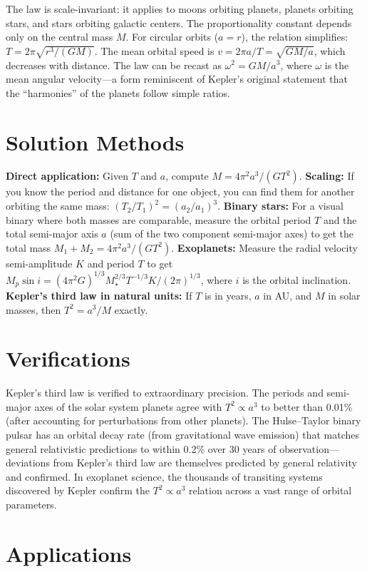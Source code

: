 \documentclass[11pt,openright]{book}
\begin{document}
The law is scale-invariant: it applies to moons orbiting planets, planets orbiting stars, and stars orbiting galactic centers. The proportionality constant depends only on the central mass $M$. For circular orbits ($a = r$), the relation simplifies: $T = 2\pi\sqrt{r^3/(GM)}$. The mean orbital speed is $v = 2\pi a/T = \sqrt{GM/a}$, which decreases with distance. The law can be recast as $\omega^2 = GM/a^3$, where $\omega$ is the mean angular velocity---a form reminiscent of Kepler's original statement that the ``harmonies'' of the planets follow simple ratios.
\section*{Solution Methods}

\textbf{Direct application:} Given $T$ and $a$, compute $M = 4\pi^2 a^3/(GT^2)$. \textbf{Scaling:} If you know the period and distance for one object, you can find them for another orbiting the same mass: $(T_2/T_1)^2 = (a_2/a_1)^3$. \textbf{Binary stars:} For a visual binary where both masses are comparable, measure the orbital period $T$ and the total semi-major axis $a$ (sum of the two component semi-major axes) to get the total mass $M_1 + M_2 = 4\pi^2 a^3/(GT^2)$. \textbf{Exoplanets:} Measure the radial velocity semi-amplitude $K$ and period $T$ to get $M_p\sin i = (4\pi^2 G)^{1/3} M_\star^{2/3} T^{-1/3} K / (2\pi)^{1/3}$, where $i$ is the orbital inclination. \textbf{Kepler's third law in natural units:} If $T$ is in years, $a$ in AU, and $M$ in solar masses, then $T^2 = a^3/M$ exactly.
\section*{Verifications}

Kepler's third law is verified to extraordinary precision. The periods and semi-major axes of the solar system planets agree with $T^2 \propto a^3$ to better than 0.01\% (after accounting for perturbations from other planets). The Hulse--Taylor binary pulsar has an orbital decay rate (from gravitational wave emission) that matches general relativistic predictions to within 0.2\% over 30 years of observation---deviations from Kepler's third law are themselves predicted by general relativity and confirmed. In exoplanet science, the thousands of transiting systems discovered by Kepler confirm the $T^2 \propto a^3$ relation across a vast range of orbital parameters.
\section*{Applications}
\end{document}
